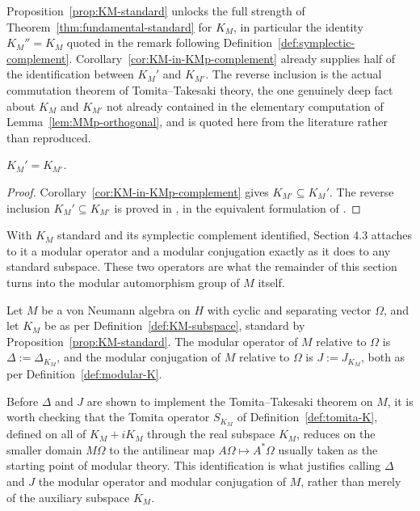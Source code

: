 Proposition~\ref{prop:KM-standard} unlocks the full strength of Theorem~\ref{thm:fundamental-standard} for $K_M$, in particular the identity $K_M'' = K_M$ quoted in the remark following Definition~\ref{def:symplectic-complement}. Corollary~\ref{cor:KM-in-KMp-complement} already supplies half of the identification between $K_M'$ and $K_{M'}$. The reverse inclusion is the actual commutation theorem of Tomita--Takesaki theory, the one genuinely deep fact about $K_M$ and $K_{M'}$ not already contained in the elementary computation of Lemma~\ref{lem:MMp-orthogonal}, and is quoted here from the literature rather than reproduced.

\begin{proposition}[$K_M' = K_{M'}$]\label{prop:KM-complement}
	$K_M' = K_{M'}$.
\end{proposition}

\begin{proof}
	Corollary~\ref{cor:KM-in-KMp-complement} gives $K_{M'} \subseteq K_M'$. The reverse inclusion $K_M' \subseteq K_{M'}$ is proved in \cite[TODO: collocazione precisa]{TODO-RieffelVanDaele}, in the equivalent formulation of \cite[TODO: collocazione precisa]{TODO-Longo}.
\end{proof}

With $K_M$ standard and its symplectic complement identified, Section 4.3 attaches to it a modular operator and a modular conjugation exactly as it does to any standard subspace. These two operators are what the remainder of this section turns into the modular automorphism group of $M$ itself.

\begin{definition}\label{def:modular-M}
	Let $M$ be a von Neumann algebra on $H$ with cyclic and separating vector $\Omega$, and let $K_M$ be as per Definition~\ref{def:KM-subspace}, standard by Proposition~\ref{prop:KM-standard}. The modular operator of $M$ relative to $\Omega$ is $\Delta := \Delta_{K_M}$, and the modular conjugation of $M$ relative to $\Omega$ is $J := J_{K_M}$, both as per Definition~\ref{def:modular-K}.
\end{definition}

Before $\Delta$ and $J$ are shown to implement the Tomita--Takesaki theorem on $M$, it is worth checking that the Tomita operator $S_{K_M}$ of Definition~\ref{def:tomita-K}, defined on all of $K_M + iK_M$ through the real subspace $K_M$, reduces on the smaller domain $M\Omega$ to the antilinear map $A\Omega \mapsto A^*\Omega$ usually taken as the starting point of modular theory. This identification is what justifies calling $\Delta$ and $J$ the modular operator and modular conjugation of $M$, rather than merely of the auxiliary subspace $K_M$.

